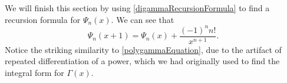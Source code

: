 We will finish this section by using \eqref{digammaRecursionFormula} to find a recursion formula for $\Psi_n (x)$.
We can see that
\begin{equation}\label{polygammaRecursionFormula}
\boxed{\Psi_n (x+1) = \Psi_n (x) + \frac{(-1)^{n} n!}{x^{n+1}}}.
\end{equation}
Notice the striking similarity to \eqref{polygammaEquation}, due to the artifact of repeated differentiation of a power, which we had originally used to find the integral form for $\Gamma(x)$.